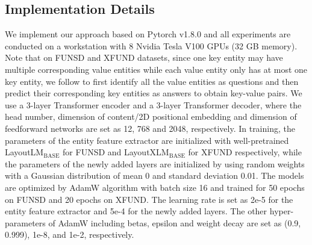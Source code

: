 \documentclass[letterpaper]{article} %
\begin{document}
\subsection{Implementation Details}
We implement our approach based on Pytorch v1.8.0 and all experiments are conducted on a workstation with 8 Nvidia Tesla V100 GPUs (32 GB memory). Note that on FUNSD and XFUND datasets, since one key entity may have multiple corresponding value entities while each value entity only has at most one key entity, we follow \cite{zhang2021entity} to first identify all the value entities as questions and then predict their corresponding key entities as answers to obtain key-value pairs. We use a 3-layer Transformer encoder and a 3-layer Transformer decoder, where the head number, dimension of content/2D positional embedding and dimension of feedforward networks are set as 12, 768 and 2048, respectively. In training, the parameters of the entity feature extractor are initialized with well-pretrained LayoutLM$_{\mathrm{BASE}}$ for FUNSD and LayoutXLM$_{\mathrm{BASE}}$ for XFUND respectively, while the parameters of the newly added layers are initialized by using random weights with a Gaussian distribution of mean 0 and standard deviation 0.01. The models are optimized by AdamW \cite{loshchilov2017decoupled} algorithm with batch size 16 and trained for 50 epochs on FUNSD and 20 epochs on XFUND. The learning rate is set as 2e-5 for the entity feature extractor and 5e-4 for the newly added layers. The other hyper-parameters of AdamW including betas, epsilon and weight decay are set as (0.9, 0.999), 1e-8, and 1e-2, respectively.
\end{document}
